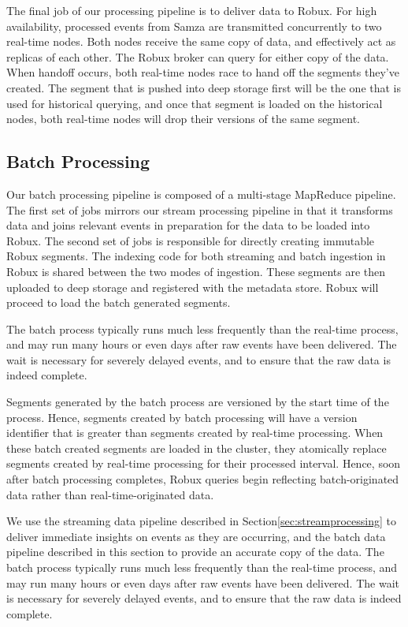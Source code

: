 \documentclass{vldb}
\begin{document}
The final job of our processing pipeline is to deliver data to Robux. For high
availability, processed events from Samza are transmitted concurrently to two
real-time nodes. Both nodes receive the same copy of data, and effectively act
as replicas of each other. The Robux broker can query for either copy of the data.
When handoff occurs, both real-time nodes race to hand off the segments they’ve
created. The segment that is pushed into deep storage first will be the one
that is used for historical querying, and once that segment is loaded on the
historical nodes, both real-time nodes will drop their versions of the same
segment.

\subsection{Batch Processing}
Our batch processing pipeline is composed of a multi-stage
MapReduce\cite{dean2008mapreduce} pipeline. The first set of jobs mirrors our
stream processing pipeline in that it transforms data and joins relevant events
in preparation for the data to be loaded into Robux. The second set of jobs is
responsible for directly creating immutable Robux segments. The indexing code
for both streaming and batch ingestion in Robux is shared between the two modes
of ingestion. These segments are then uploaded to deep storage and registered
with the metadata store. Robux will proceed to load the batch generated
segments.

The batch process typically runs much less frequently than the real-time
process, and may run many hours or even days after raw events have been
delivered. The wait is necessary for severely delayed events, and to ensure
that the raw data is indeed complete. 

Segments generated by the batch process are versioned by the start time of the
process. Hence, segments created by batch processing will have a version
identifier that is greater than segments created by real-time processing. When
these batch created segments are loaded in the cluster, they atomically replace
segments created by real-time processing for their processed interval. Hence,
soon after batch processing completes, Robux queries begin reflecting
batch-originated data rather than real-time-originated data.

We use the streaming data pipeline described in
Section\ref{sec:streamprocessing} to deliver immediate insights on events as
they are occurring, and the batch data pipeline described in this section to
provide an accurate copy of the data. The batch process typically runs much
less frequently than the real-time process, and may run many hours or even days
after raw events have been delivered. The wait is necessary for severely
delayed events, and to ensure that the raw data is indeed complete. 
\end{document}
